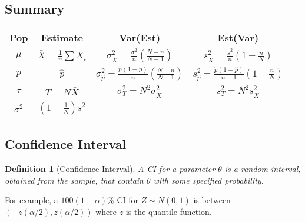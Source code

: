 \documentclass[12pt]{article}
\newtheorem{definition}{Definition}[section]
\theoremstyle{definition}
\begin{document}
\subsection{Summary}
\begin{table}[h]
\centering
\begin{tabular}{|c|c|c|c|}
\hline
Pop & Estimate & Var(Est) & Est(Var) \\\hline
$\mu$                & $\bar{X} = \frac{1}{n}\sum X_i$ & $\sigma^2_{\bar{X}} = \frac{\sigma^2}{n}(\frac{N-n}{N-1})$ & $s_{\bar{X}}^2 = \frac{s^2}{n}(1-\frac{n}{N})$\\\hline
$p$                  & $\hat{p}$                               & $\sigma^2_{\hat{p}} = \frac{p(1-p)}{n}(\frac{N-n}{N-1})$     & $s_{\hat{p}}^2 = \frac{\hat{p}(1-\hat{p})}{n-1}(1-\frac{n}{N})$ \\\hline
$\tau$               & $T=N\bar{X}$                            & $\sigma_T^2 = N^2\sigma_{\bar{X}}^2$                         & $s_T^2 = N^2s^2_{\bar{X}}$\\\hline
$\sigma^2$           & $(1-\frac{1}{N})s^2$\\\hline
\end{tabular}
\end{table}
\subsection{Confidence Interval}
\begin{definition}[Confidence Interval]
\normalfont A CI for a parameter $\theta$ is a random interval, obtained from the sample, that contain $\theta$ with some specified probability.
\end{definition}
For example, a $100(1-\alpha)$\% CI for $Z\sim N(0,1)$ is between $(-z(\alpha/2), z(\alpha/2))$ where $z$ is the quantile function.
\end{document}
